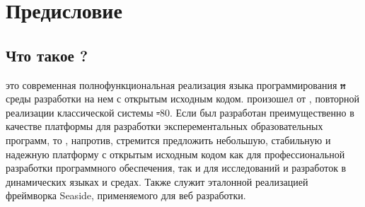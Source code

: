 \documentclass[a4paper,10pt,twoside]{book}
\begin{document}
	\sloppy
	\frontmatter
\fi
\chapter{Предисловие}
\section*{Что такое \pharo?}


\pharo это современная полнофункциональная реализация языка программирования \st и среды разработки на нем с открытым исходным кодом. \pharo произошел от \squeak\cite{Inga97a}, повторной реализации классической системы \st-80. Если \squeak был разработан преимущественно в качестве платформы для разработки эксперементальных образовательных программ, то \pharo, напротив, стремится предложить небольшую, стабильную и надежную платформу с открытым исходным кодом как для профессиональной разработки программного обеспечения, так и для исследований и разработок в динамических языках и средах. Также \pharo служит эталонной реализацией фреймворка Seaside, применяемого для веб разработки.

\end{document}
